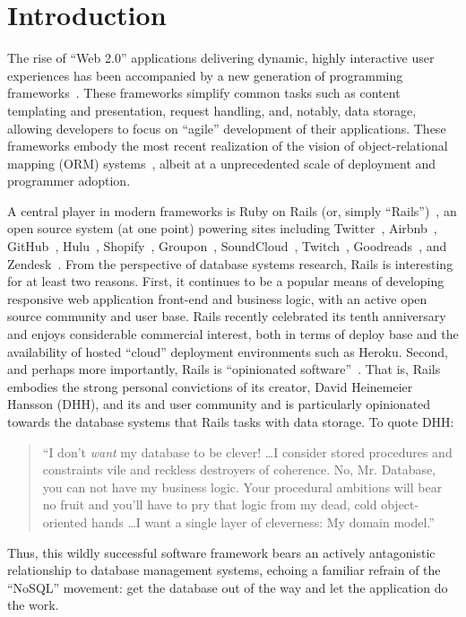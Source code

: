 
\section{Introduction}

The rise of ``Web 2.0'' applications delivering dynamic, highly
interactive user experiences has been accompanied by a new generation
of programming frameworks~\cite{web20}. These frameworks simplify
common tasks such as content templating and presentation, request
handling, and, notably, data storage, allowing developers to focus on
``agile'' development of their applications. These frameworks embody
the most recent realization of the vision of object-relational mapping
(ORM) systems~\cite{orm-db}, albeit at a unprecedented scale of deployment and
programmer adoption.

A central player in modern frameworks is Ruby on Rails (or, simply
``Rails'')~\cite{rails-book,rails-computer}, an open source system (at one point) powering sites
including Twitter~\cite{twitter-rails}, Airbnb~\cite{airbnb-rails},
GitHub~\cite{github-rails}, Hulu~\cite{hulu-rails}, Shopify~\cite{shopify-rails},
Groupon~\cite{groupon-rails}, SoundCloud~\cite{soundcloud-rails}, Twitch~\cite{twitch-rails},
Goodreads~\cite{goodreads-rails}, and Zendesk~\cite{zendesk-rails}. From the perspective of database systems
research, Rails is interesting for at least two reasons. First, it
continues to be a popular means of developing responsive web
application front-end and business logic, with an active open source
community and user base. Rails recently celebrated its tenth
anniversary and enjoys considerable commercial interest, both in terms
of deploy base and the availability of hosted ``cloud'' deployment environments such as
Heroku. Second, and perhaps more importantly, Rails is ``opinionated
software''~\cite{dhh-opinionated}. That is, Rails embodies the strong personal convictions
of its creator, David Heinemeier Hansson (DHH), and its and user
community and is particularly opinionated towards the database systems
that Rails tasks with data storage. To
quote DHH:
\begin{quote}
``I don't \textit{want} my database to be clever! \dots I consider stored procedures and constraints vile and reckless destroyers of coherence. No, Mr. Database, you can not have my business logic. Your procedural ambitions will bear no fruit and you'll have to pry that logic from my dead, cold object-oriented hands \dots I want a single layer of cleverness: My domain model.''~\cite{dhh-clever}
\end{quote}
Thus, this wildly successful software framework bears an actively
antagonistic relationship to database management systems, echoing a familiar refrain of the ``NoSQL'' movement: get the database out of the way and let the application do the work.

